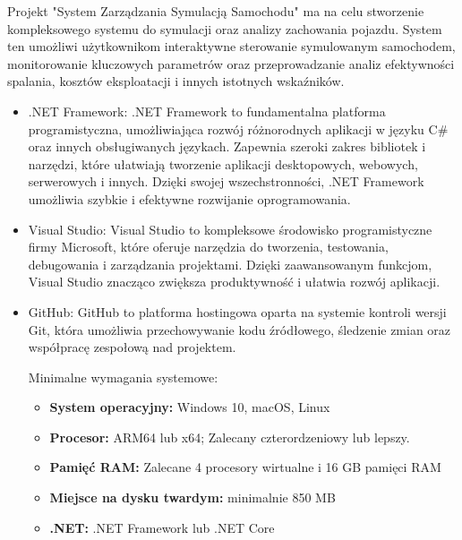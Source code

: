 Projekt "System Zarządzania Symulacją Samochodu" ma na celu stworzenie kompleksowego systemu do symulacji oraz analizy zachowania pojazdu. System ten umożliwi użytkownikom interaktywne sterowanie symulowanym samochodem, monitorowanie kluczowych parametrów oraz przeprowadzanie analiz efektywności spalania, kosztów eksploatacji i innych istotnych wskaźników.
\begin{itemize}
\item .NET Framework: .NET Framework to fundamentalna platforma programistyczna, umożliwiająca rozwój różnorodnych aplikacji w języku C\# oraz innych obsługiwanych językach. Zapewnia szeroki zakres bibliotek i narzędzi, które ułatwiają tworzenie aplikacji desktopowych, webowych, serwerowych i innych. Dzięki swojej wszechstronności, .NET Framework umożliwia szybkie i efektywne rozwijanie oprogramowania.
\item Visual Studio: Visual Studio to kompleksowe środowisko programistyczne firmy Microsoft, które oferuje narzędzia do tworzenia, testowania, debugowania i zarządzania projektami. Dzięki zaawansowanym funkcjom, Visual Studio znacząco zwiększa produktywność i ułatwia rozwój aplikacji.
\item GitHub: GitHub to platforma hostingowa oparta na systemie kontroli wersji Git, która umożliwia przechowywanie kodu źródłowego, śledzenie zmian oraz współpracę zespołową nad projektem. 

Minimalne wymagania systemowe:
\begin{itemize}
    \item \textbf{System operacyjny:} Windows 10, macOS, Linux 
    \item \textbf{Procesor:} ARM64 lub x64; Zalecany czterordzeniowy lub lepszy.
    \item \textbf{Pamięć RAM:} Zalecane 4 procesory wirtualne i 16 GB pamięci RAM
    \item \textbf{Miejsce na dysku twardym:} minimalnie 850 MB
    \item \textbf{.NET:} .NET Framework lub .NET Core
\end{itemize}
\end{itemize}
